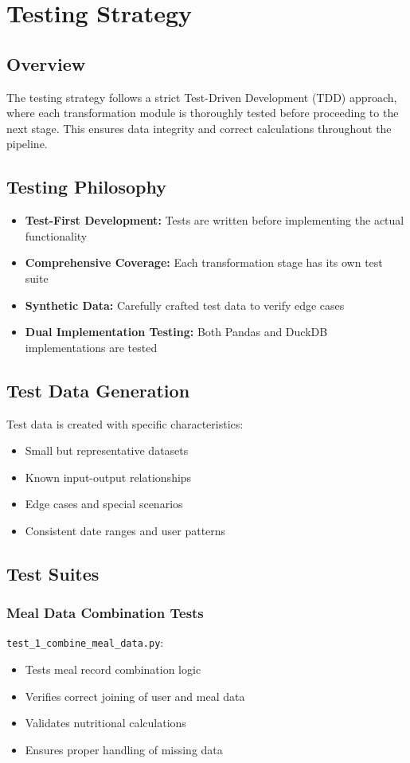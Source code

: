 \section{Testing Strategy}

\subsection{Overview}
The testing strategy follows a strict Test-Driven Development (TDD) approach, where each transformation module is thoroughly tested before proceeding to the next stage. This ensures data integrity and correct calculations throughout the pipeline.

\subsection{Testing Philosophy}
\begin{itemize}
    \item \textbf{Test-First Development:} Tests are written before implementing the actual functionality
    \item \textbf{Comprehensive Coverage:} Each transformation stage has its own test suite
    \item \textbf{Synthetic Data:} Carefully crafted test data to verify edge cases
    \item \textbf{Dual Implementation Testing:} Both Pandas and DuckDB implementations are tested
\end{itemize}

\subsection{Test Data Generation}
Test data is created with specific characteristics:
\begin{itemize}
    \item Small but representative datasets
    \item Known input-output relationships
    \item Edge cases and special scenarios
    \item Consistent date ranges and user patterns
\end{itemize}

\subsection{Test Suites}

\subsubsection{Meal Data Combination Tests}
\texttt{test\_1\_combine\_meal\_data.py}:
\begin{itemize}
    \item Tests meal record combination logic
    \item Verifies correct joining of user and meal data
    \item Validates nutritional calculations
    \item Ensures proper handling of missing data
\end{itemize}

